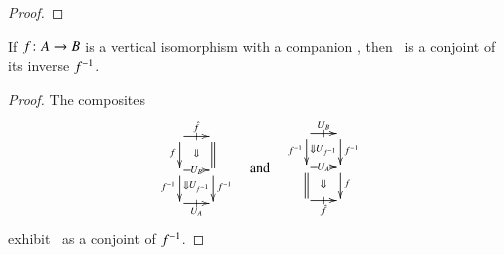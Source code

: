 \documentclass{amsart}
\begin{document}
\begin{proof}
\end{proof}


\begin{lem}\label{thm:comp-iso}
  If $f\colon A\to B$ is a vertical isomorphism with a companion \fhat,
  then \fhat\ is a conjoint of its inverse $f^{-1}$.
\end{lem}
\begin{proof}
  The composites
  \[\vcenter{\xymatrix@-.5pc{
      \ar[r]|-@{|}^{\fhat}\ar[d]_f \ar@{}[dr]|{\Downarrow} &
      \ar@{=}[d]\\
      \ar[r]|{U_B}\ar[d]_{f\inv} \ar@{}[dr]|{\Downarrow U_{f\inv}} &
      \ar[d]^{f\inv}\\
      \ar[r]|-@{|}_{U_A} &
    }}\quad\text{and}\quad
  \vcenter{\xymatrix@-.5pc{
      \ar[r]|-@{|}^{U_B}\ar[d]_{f\inv} \ar@{}[dr]|{\Downarrow U_{f\inv}} &
      \ar[d]^{f\inv}\\
      \ar[r]|{U_A}\ar@{=}[d] \ar@{}[dr]|{\Downarrow} &
      \ar[d]^f\\
      \ar[r]|-@{|}_{\fhat} &
    }}
  \]
  exhibit \fhat\ as a conjoint of $f^{-1}$.
\end{proof}
\end{document}
